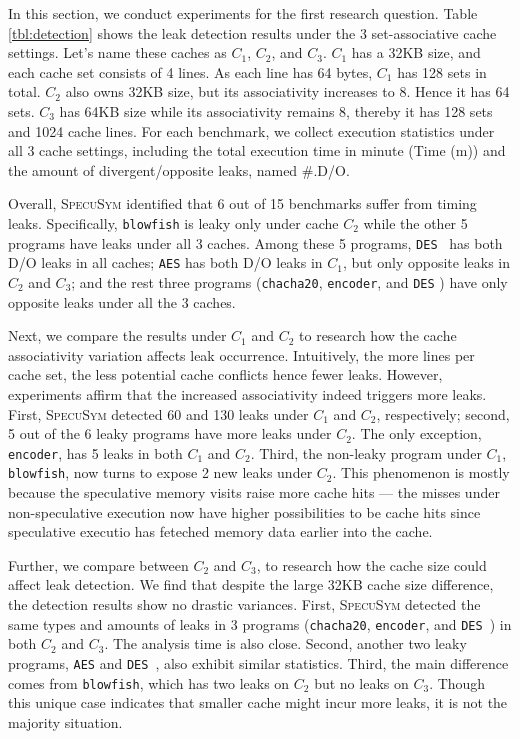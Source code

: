 \documentclass[sigconf]{acmart}
\newcommand{\SpecuSym}{\textsc{SpecuSym} }
\begin{document}
In this section, we conduct experiments for the first research question. Table
\ref{tbl:detection} shows the leak detection results under the 3 set-associative 
cache settings. Let's name these caches as {$C_1$}, $C_2$, and $C_3$. $C_1$ has 
a 32KB size, and each cache set consists of 4 lines. As each line has 64 bytes, 
$C_1$ has 128 sets in total. $C_2$ also owns 32KB size, but its associativity 
increases to 8. Hence it has 64 sets. $C_3$ has 64KB size while its associativity 
remains 8, thereby it has 128 sets and 1024 cache lines. For each benchmark, we 
collect execution statistics under all 3 cache settings, including the total 
execution time in minute (Time (m)) and the amount of divergent/opposite leaks,
named \#.D/O. 


Overall, \SpecuSym identified that 6 out of 15 benchmarks suffer from timing 
leaks. Specifically, \texttt{blowfish} is leaky only under cache $C_2$ while 
the other 5 programs have leaks under all 3 caches. Among these 5 programs, 
\texttt{DES}~\cite{glibc} has both D/O leaks in all caches; \texttt{AES} has 
both D/O leaks in $C_1$, but only opposite leaks in $C_2$ and $C_3$; and the 
rest three programs (\texttt{chacha20}, \texttt{encoder}, and \texttt{DES}
\cite{OpenSSL111c}) have only opposite leaks under all the 3 caches.





Next, we compare the results under $C_1$ and $C_2$ to research how the cache 
associativity variation affects leak occurrence. Intuitively, the more lines 
per cache set, the less potential cache conflicts hence fewer leaks. However, 
experiments affirm that the increased associativity indeed triggers more leaks. 
First, \SpecuSym detected 60 and 130 leaks under $C_1$ and $C_2$, respectively; 
second, 5 out of the 6 leaky programs have more leaks under $C_2$. The only 
exception, \texttt{encoder}, has 5 leaks in both $C_1$ and $C_2$. Third, the 
non-leaky program under $C_1$, \texttt{blowfish}, now turns to expose 2 new 
leaks under $C_2$. This phenomenon is mostly because the speculative memory 
visits raise more cache hits --- the misses under non-speculative execution 
now have higher possibilities to be cache hits since speculative executio has
feteched memory data earlier into the cache. 


Further, we compare between $C_2$ and $C_3$, to research how the cache size 
could affect leak detection. We find that despite the large 32KB cache size 
difference, the detection results show no drastic variances. First, \SpecuSym
detected the same types and amounts of leaks in 3 programs (\texttt{chacha20}, 
\texttt{encoder}, and \texttt{DES}~\cite{OpenSSL111c}) in both $C_2$ and
$C_3$. The analysis time is also close. Second, another two leaky programs, 
\texttt{AES} and \texttt{DES}~\cite{glibc}, also exhibit similar statistics.
Third, the main difference comes from \texttt{blowfish}, which has two leaks 
on $C_2$ but no leaks on $C_3$. Though this unique case indicates that smaller 
cache might incur more leaks, it is not the majority situation. 
\end{document}
